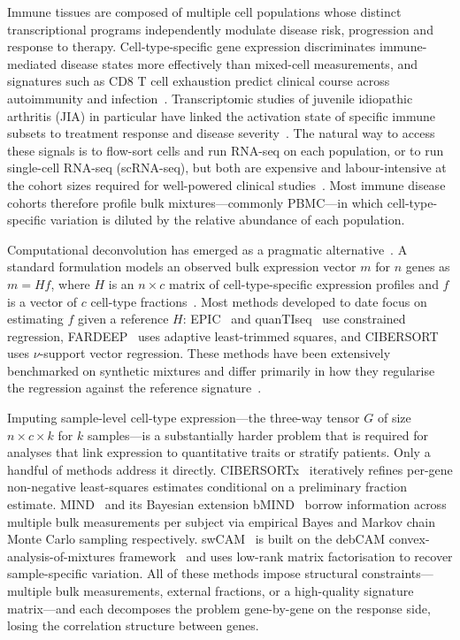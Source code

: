 \documentclass[11pt]{article}
\begin{document}
Immune tissues are composed of multiple cell populations whose distinct
transcriptional programs independently modulate disease risk, progression
and response to therapy. Cell-type-specific gene expression discriminates
immune-mediated disease states more effectively than mixed-cell
measurements, and signatures such as CD8 T cell exhaustion predict
clinical course across autoimmunity and infection~\citep{mckinney2015tcell}.
Transcriptomic studies of juvenile idiopathic arthritis (JIA) in
particular have linked the activation state of specific immune subsets
to treatment response and disease severity~\citep{throm2018juvenile}. The
natural way to access these signals is to flow-sort cells and run
RNA-seq on each population, or to run single-cell
RNA-seq (scRNA-seq), but both are expensive and labour-intensive at the
cohort sizes required for well-powered clinical
studies~\citep{oelen2022singlecell,monaco2019rnaseq}. Most immune disease
cohorts therefore profile bulk mixtures---commonly PBMC---in which
cell-type-specific variation is diluted by the relative abundance of
each population.

Computational deconvolution has emerged as a pragmatic
alternative~\citep{avilacobos2020benchmarking}. A standard formulation
models an observed bulk expression vector $m$ for $n$ genes as $m = H
f$, where $H$ is an $n \times c$ matrix of cell-type-specific expression
profiles and $f$ is a vector of $c$ cell-type
fractions~\citep{shenorr2010cssam}. Most methods developed to date
focus on estimating $f$ given a reference $H$: EPIC~\citep{racle2017epic}
and quanTIseq~\citep{finotello2019quantiseq} use constrained regression,
FARDEEP~\citep{hao2019fardeep} uses adaptive least-trimmed squares, and
CIBERSORT~\citep{newman2015robust} uses $\nu$-support vector regression.
These methods have been extensively benchmarked on synthetic mixtures
and differ primarily in how they regularise the regression against the
reference signature~\citep{avilacobos2020benchmarking}.

Imputing sample-level cell-type expression---the three-way tensor $G$
of size $n \times c \times k$ for $k$ samples---is a substantially
harder problem that is required for analyses that link expression to
quantitative traits or stratify patients. Only a handful of methods
address it directly. CIBERSORTx~\citep{newman2019cibersortx} iteratively
refines per-gene non-negative least-squares estimates conditional on a
preliminary fraction estimate. MIND~\citep{wang2020mind} and its
Bayesian extension bMIND~\citep{wang2024bmind} borrow information across
multiple bulk measurements per subject via empirical Bayes and Markov
chain Monte Carlo sampling respectively. swCAM~\citep{chen2022swcam} is
built on the debCAM convex-analysis-of-mixtures
framework~\citep{chen2020debcam,wang2016undo} and uses low-rank matrix
factorisation to recover sample-specific variation. All of these
methods impose structural constraints---multiple bulk measurements,
external fractions, or a high-quality signature matrix---and each
decomposes the problem gene-by-gene on the response side, losing the
correlation structure between genes.
\end{document}
